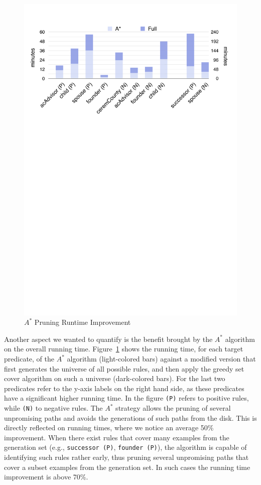 \begin{figure}[t]
	\centering
	\includegraphics[width=\columnwidth]{include/figure/a*_runtime_improv.pdf}
	\caption{$A^*$ Pruning Runtime Improvement}
	\label{fig:pruning_impact}
\end{figure}
Another aspect we wanted to quantify is the benefit brought by the $A^*$ algorithm on the overall running time. Figure~\ref{fig:pruning_impact} shows the running time, for each target predicate, of the $A^*$ algorithm (light-colored bars) against a modified version that first generates the universe of all possible rules, and then apply the greedy set cover algorithm on such a universe (dark-colored bars). For the last two predicates refer to the y-axis labels on the right hand side, as these predicates have a significant higher running time. In the figure \texttt{(P)} refers to positive rules, while \texttt{(N)} to negative rules.
The $A^*$ strategy allows the pruning of several unpromising paths and avoids the generations of such paths from the disk. This is directly reflected on running times, where we notice an average 50\% improvement. When there exist rules that cover many examples from the generation set (e.g., \texttt{successor (P)}, \texttt{founder (P)}), the algorithm is capable of identifying such rules rather early, thus pruning several unpromising paths that cover a subset examples from the generation set. In such cases the running time improvement is above 70\%.
